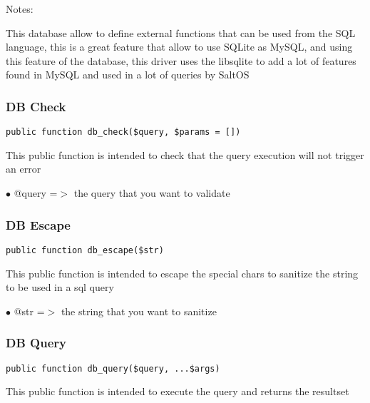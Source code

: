 \documentclass[a4paper]{article}
\begin{document}
Notes:

This database allow to define external functions that can be used from the SQL language,
this is a great feature that allow to use SQLite as MySQL, and using this feature of the
database, this driver uses the libsqlite to add a lot of features found in MySQL and
used in a lot of queries by SaltOS

\hypertarget{toc357}{}
\subsubsection{DB Check}

\begin{lstlisting}
public function db_check($query, $params = [])
\end{lstlisting}

This public function is intended to check that the query execution will not trigger an error

\begin{compactitem}
\item[\color{myblue}$\bullet$] @query =$>$ the query that you want to validate
\end{compactitem}

\hypertarget{toc358}{}
\subsubsection{DB Escape}

\begin{lstlisting}
public function db_escape($str)
\end{lstlisting}

This public function is intended to escape the special chars to sanitize the string to be used
in a sql query

\begin{compactitem}
\item[\color{myblue}$\bullet$] @str =$>$ the string that you want to sanitize
\end{compactitem}

\hypertarget{toc359}{}
\subsubsection{DB Query}

\begin{lstlisting}
public function db_query($query, ...$args)
\end{lstlisting}

This public function is intended to execute the query and returns the resultset
\end{document}
